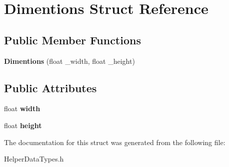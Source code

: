 \hypertarget{struct_dimentions}{}\section{Dimentions Struct Reference}
\label{struct_dimentions}
\subsection*{Public Member Functions}
\begin{DoxyCompactItemize}
\item 
\mbox{\label{struct_dimentions_a09f92ee6239282f5d76c77d87f46f93e}} 
{\bfseries Dimentions} (float \+\_\+width, float \+\_\+height)
\end{DoxyCompactItemize}
\subsection*{Public Attributes}
\begin{DoxyCompactItemize}
\item 
\mbox{\label{struct_dimentions_ab97c472cbe82f80e9a3a4f4c2ad9fe67}} 
float {\bfseries width}
\item 
\mbox{\label{struct_dimentions_a5481fb9860d7b293a20c720c027bae3a}} 
float {\bfseries height}
\end{DoxyCompactItemize}


The documentation for this struct was generated from the following file\+:\begin{DoxyCompactItemize}
\item 
Helper\+Data\+Types.\+h\end{DoxyCompactItemize}

